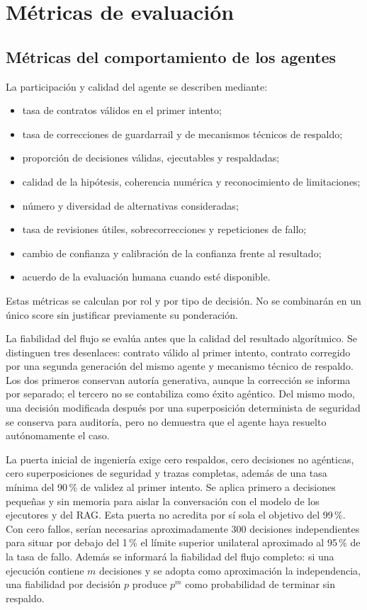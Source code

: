 \section{Métricas de evaluación}

\subsection{Métricas del comportamiento de los agentes}

La participación y calidad del agente se describen mediante:

\begin{itemize}
  \item tasa de contratos válidos en el primer intento;
  \item tasa de correcciones de guardarrail y de mecanismos técnicos de respaldo;
  \item proporción de decisiones válidas, ejecutables y respaldadas;
  \item calidad de la hipótesis, coherencia numérica y reconocimiento de
        limitaciones;
  \item número y diversidad de alternativas consideradas;
  \item tasa de revisiones útiles, sobrecorrecciones y repeticiones de fallo;
  \item cambio de confianza y calibración de la confianza frente al resultado;
  \item acuerdo de la evaluación humana cuando esté disponible.
\end{itemize}

Estas métricas se calculan por rol y por tipo de decisión. No se combinarán en
un único score sin justificar previamente su ponderación.

La fiabilidad del flujo se evalúa antes que la calidad del resultado
algorítmico. Se distinguen tres desenlaces: contrato válido al primer intento,
contrato corregido por una segunda generación del mismo agente y mecanismo
técnico de respaldo. Los dos primeros conservan autoría generativa, aunque la
corrección se informa por separado; el tercero no se contabiliza como éxito
agéntico. Del mismo modo, una decisión modificada después por una superposición
determinista de seguridad se conserva para auditoría, pero no demuestra que el
agente haya resuelto autónomamente el caso.

La puerta inicial de ingeniería exige cero respaldos, cero decisiones no
agénticas, cero superposiciones de seguridad y trazas completas, además de una
tasa mínima del 90\,\% de validez al primer intento. Se aplica primero a
decisiones pequeñas y sin memoria para aislar la conversación con el modelo de
los ejecutores y del RAG. Esta puerta no acredita por sí sola el objetivo del
99\,\%. Con cero fallos, serían necesarias aproximadamente 300 decisiones
independientes para situar por debajo del 1\,\% el límite superior unilateral
aproximado al 95\,\% de la tasa de fallo. Además se informará la fiabilidad del
flujo completo: si una ejecución contiene $m$ decisiones y se adopta como
aproximación la independencia, una fiabilidad por decisión $p$ produce
$p^m$ como probabilidad de terminar sin respaldo.

